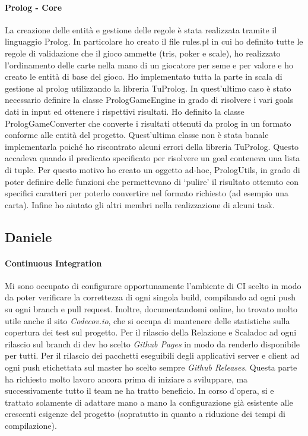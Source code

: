 \paragraph{Prolog - Core}
La creazione delle entità e gestione delle regole è stata realizzata tramite il linguaggio Prolog.
In particolare ho creato il file rules.pl in cui ho definito tutte le regole di validazione che il gioco ammette (tris, poker e scale), ho realizzato l’ordinamento delle carte nella mano di un giocatore per seme e per valore e ho creato le entità di base del gioco.
Ho implementato tutta la parte in scala di gestione al prolog utilizzando la libreria TuProlog.
In quest'ultimo caso è stato necessario definire la classe PrologGameEngine in grado di risolvere i vari goals dati in input ed ottenere i rispettivi risultati.
Ho definito la classe PrologGameConverter che converte i risultati ottenuti da prolog in un formato conforme alle entità del progetto.
Quest’ultima classe non è stata banale implementarla poiché ho riscontrato alcuni errori della libreria TuProlog.
Questo accadeva quando il predicato specificato per risolvere un goal conteneva una lista di tuple.
Per questo motivo ho creato un oggetto ad-hoc, PrologUtils, in grado di poter definire delle funzioni che permettevano di ‘pulire’ il risultato ottenuto con specifici caratteri per poterlo convertire nel formato richiesto (ad esempio una carta).
Infine ho aiutato gli altri membri nella realizzazione di alcuni task.

\subsection{Daniele}

\paragraph{Continuous Integration}
Mi sono occupato di configurare opportunamente l'ambiente di CI scelto in modo da poter verificare la correttezza di ogni singola build, compilando ad ogni push su ogni branch e pull request.
Inoltre, documentandomi online, ho trovato molto utile anche il sito \textit{Codecov.io}, che si occupa di mantenere delle statistiche sulla copertura dei test sul progetto.
Per il rilascio della Relazione e Scaladoc ad ogni rilascio sul branch di dev ho scelto \textit{Github Pages} in modo da renderlo disponibile per tutti.
Per il rilascio dei pacchetti eseguibili degli applicativi server e client ad ogni push etichettata sul master ho scelto sempre \textit{Github Releases}.
Questa parte ha richiesto molto lavoro ancora prima di iniziare a sviluppare, ma successivamente tutto il team ne ha tratto beneficio.
In corso d'opera, si e trattato solamente di adattare mano a mano la configurazione già esistente alle crescenti esigenze del progetto (sopratutto in quanto a riduzione dei tempi di compilazione).

